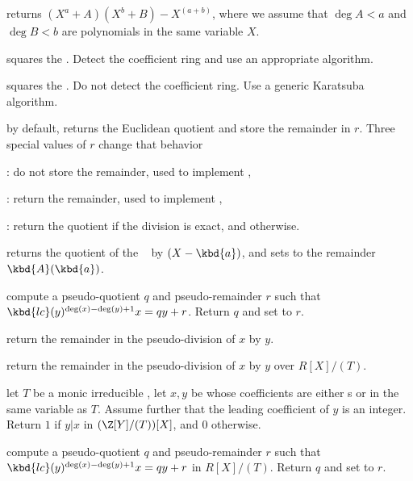 returns $(X^a + A)(X^b + B) - X^(a+b)$, where we assume that $\deg A < a$
and $\deg B < b$ are polynomials in the same variable $X$.

 squares the  . Detect the coefficient
ring and use an appropriate algorithm.

 squares the  . Do not detect the
coefficient ring.  Use a generic Karatsuba algorithm.

 by default, returns the Euclidean
quotient and store the remainder in $r$. Three special values of $r$ change
that behavior
\item {}: do not store the remainder, used to implement ,

\item {}: return the remainder, used to implement ,

\item {}: return the quotient if the division is exact, and
 otherwise.


 returns the
quotient of the ~ by $(X - \kbd{a})$, and sets  to the
remainder $\kbd{A}(\kbd{a})$.


 compute a pseudo-quotient
$q$ and pseudo-remainder $r$ such that $\kbd{lc}(y)^{\deg(x) - \deg(y) + 1}x
= qy + r$. Return $q$ and set  to $r$.

 return the remainder
in the pseudo-division of $x$ by $y$.

 return the remainder
in the pseudo-division of $x$ by $y$ over $R[X]/(T)$.

 let $T$ be a monic irreducible
, let $x, y$ be  whose coefficients are either s or
 in the same variable as $T$. Assume further that the leading
coefficient of $y$ is an integer. Return $1$ if $y | x$ in $(\Z[Y]/(T))[X]$,
and $0$ otherwise.

 compute
a pseudo-quotient $q$ and pseudo-remainder $r$ such that
$\kbd{lc}(y)^{\deg(x) - \deg(y) + 1}x = qy + r$ in $R[X]/(T)$. Return $q$ and
set  to $r$.

